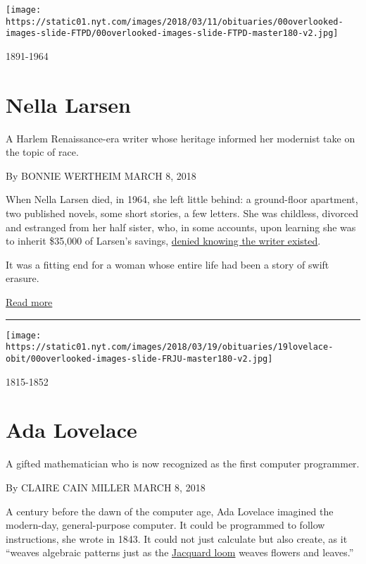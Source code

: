 \texttt{[image: https://static01.nyt.com/images/2018/03/11/obituaries/00overlooked-images-slide-FTPD/00overlooked-images-slide-FTPD-master180-v2.jpg]}

1891-1964

\hypertarget{nella-larsen}{%
\section{Nella Larsen}\label{nella-larsen}}

A Harlem Renaissance-era writer whose heritage informed her modernist
take on the topic of race.

By BONNIE WERTHEIM MARCH 8, 2018

When Nella Larsen died, in 1964, she left little behind: a ground-floor
apartment, two published novels, some short stories, a few letters. She
was childless, divorced and estranged from her half sister, who, in some
accounts, upon learning she was to inherit \$35,000 of Larsen's savings,
\href{https://books.google.com/books?id=yIdqlAFm_-cC\&pg=PA23\&lpg=PA23\&dq\#v=onepage\&q\&f=false}{denied
knowing the writer existed}.

It was a fitting end for a woman whose entire life had been a story of
swift erasure.

\href{https://www.nytimes.com/interactive/2018/obituaries/overlooked-nella-larsen.html}{Read
more}

\begin{center}\rule{0.5\linewidth}{\linethickness}\end{center}

\texttt{[image: https://static01.nyt.com/images/2018/03/19/obituaries/19lovelace-obit/00overlooked-images-slide-FRJU-master180-v2.jpg]}

1815-1852

\hypertarget{ada-lovelace}{%
\section{Ada Lovelace}\label{ada-lovelace}}

A gifted mathematician who is now recognized as the first computer
programmer.

By CLAIRE CAIN MILLER MARCH 8, 2018

A century before the dawn of the computer age, Ada Lovelace imagined the
modern-day, general-purpose computer. It could be programmed to follow
instructions, she wrote in 1843. It could not just calculate but also
create, as it ``weaves algebraic patterns just as the
\href{https://en.wikipedia.org/wiki/Jacquard_loom}{Jacquard loom} weaves
flowers and leaves.''

